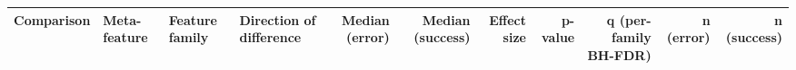 \documentclass[border=0pt]{standalone}
\begin{document}
\begin{adjustbox}{width=\textwidth}
\begin{tabular}{@{}llllrrrrrrr@{}}
\toprule
Comparison & Meta-feature & Feature family & Direction of difference & Median (error) & Median (success) & Effect size & p-value & q (per-family BH-FDR) & n (error) & n (success) \\
\midrule
\bottomrule
\end{tabular}
\end{adjustbox}
\end{document}
